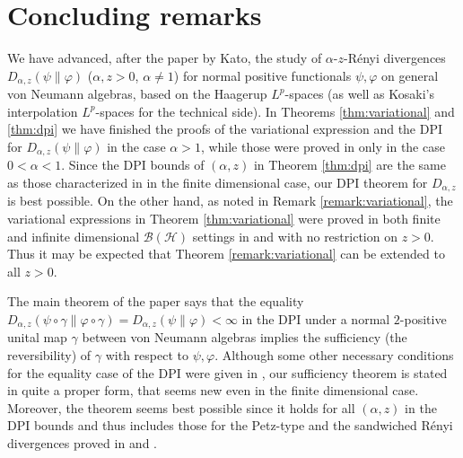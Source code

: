 \documentclass[12pt]{article}
\theoremstyle{definition}
\theoremstyle{remark}
\numberwithin{equation}{section}
\def\ffi{\varphi}
\begin{document}
{\color{blue}
\section{Concluding remarks}

We have advanced, after the paper \cite{kato2023onrenyi} by Kato, the study of $\alpha$-$z$-R\'enyi
divergences $D_{\alpha,z}(\psi\|\ffi)$ ($\alpha,z>0$, $\alpha\ne1$) for normal positive functionals $\psi,\ffi$
on general von Neumann algebras, based on the Haagerup $L^p$-spaces (as well as Kosaki's
interpolation $L^p$-spaces for the technical side). In Theorems \ref{thm:variational} and \ref{thm:dpi}
we have finished the proofs of the variational expression and the DPI for $D_{\alpha,z}(\psi\|\ffi)$ in the case
$\alpha>1$, while those were proved in \cite{kato2023onrenyi} only in the case $0<\alpha<1$. Since the
DPI bounds of $(\alpha,z)$ in Theorem \ref{thm:dpi} are the same as those characterized in
\cite{zhang2020fromwyd} in the finite dimensional case, our DPI theorem for $D_{\alpha,z}$ is best possible.
On the other hand, as noted in Remark \ref{remark:variational}, the variational expressions in Theorem
\ref{thm:variational} were proved in both finite and infinite dimensional $\mathcal{B}(\mathcal{H})$ settings
in \cite{zhang2020fromwyd} and \cite{mosonyi2023thestrong} with no restriction on $z>0$. Thus it may
be expected that Theorem \ref{remark:variational} can be extended to all $z>0$.

The main theorem of the paper says that the equality
$D_{\alpha,z}(\psi\circ\gamma\|\ffi\circ\gamma)=D_{\alpha,z}(\psi\|\ffi)<\infty$ in the DPI under a normal
$2$-positive unital map $\gamma$ between von Neumann algebras implies the sufficiency (the reversibility)
of $\gamma$ with respect to $\psi,\ffi$. Although some other necessary conditions for the equality case of
the DPI were given in \cite{zhang2020equality}, our sufficiency theorem is stated in quite a proper form,
that seems new even in the finite dimensional case. Moreover, the theorem seems best possible since it
holds for all $(\alpha,z)$ in the DPI bounds and thus includes those for the Petz-type and the sandwiched
R\'enyi divergences proved in \cite[Theorem 6.19]{hiai2021quantum} and
\cite{jencova2018renyi,jencova2021renyi}.

}
\end{document}
